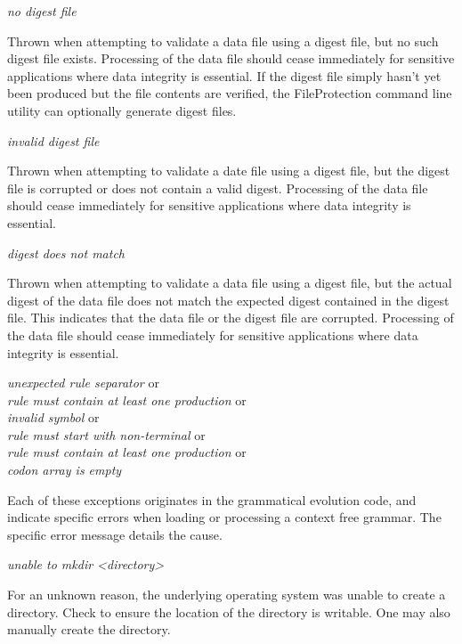 \noindent
\textit{no digest file}
\begin{indented}
  Thrown when attempting to validate a data file using a digest file, but no such digest file exists.  Processing of the data file should cease immediately for sensitive applications where data integrity is essential. If the digest file simply hasn't yet been produced but the file contents are verified, the FileProtection command line utility can optionally generate digest files.
\end{indented}
  
\noindent
\textit{invalid digest file}
\begin{indented}
  Thrown when attempting to validate a date file using a digest file, but the digest file is corrupted or does not contain a valid digest.  Processing of the data file should cease immediately for sensitive applications where data integrity is essential.
\end{indented}

\noindent
\textit{digest does not match}
\begin{indented}
  Thrown when attempting to validate a data file using a digest file, but the actual digest of the data file does not match the expected digest contained in the digest file.  This indicates that the data file or the digest file are corrupted.  Processing of the data file should cease immediately for sensitive applications where data integrity is essential.
\end{indented}
  
\noindent
\textit{unexpected rule separator} or\\
\textit{rule must contain at least one production} or\\
\textit{invalid symbol} or\\
\textit{rule must start with non-terminal} or\\
\textit{rule must contain at least one production} or\\
\textit{codon array is empty}
\begin{indented}
  Each of these exceptions originates in the grammatical evolution code, and indicate specific errors when loading or processing a context free grammar. The specific error message details the cause.
\end{indented}

\noindent
\textit{unable to mkdir <directory>}
\begin{indented}
  For an unknown reason, the underlying operating system was unable to create a directory.  Check to ensure the location of the directory is writable.  One may also manually create the directory.
\end{indented}
  
